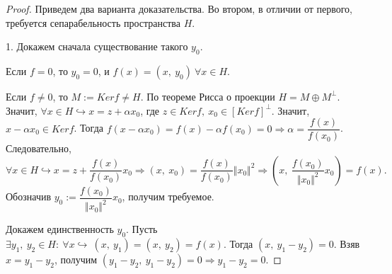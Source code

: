 \begin{proof}
Приведем два варианта доказательства. Во втором, в отличии от первого, требуется сепарабельность пространства $\displaystyle H$.

1. Докажем сначала существование такого $\displaystyle y_{0}$.

Если $\displaystyle f=0$, то $\displaystyle y_{0} =0$, и $\displaystyle f( x) =( x,\ y_{0}) \ \forall x\in H$.

Если $\displaystyle f\neq 0$, то $\displaystyle M:=Kerf\neq H$. По теореме Рисса о проекции $\displaystyle H=M\oplus M^{\perp }$. Значит, $\displaystyle \forall x\in H\hookrightarrow x=z+\alpha x_{0}$, где $\displaystyle z\in Kerf,\ x_{0} \in [ Kerf]^{\perp }$. Значит, $\displaystyle x-\alpha x_{0} \in Kerf$. Тогда $\displaystyle f( x-\alpha x_{0}) =f( x) -\alpha f( x_{0}) =0\Rightarrow \alpha =\dfrac{f( x)}{f( x_{0})}$. Следовательно,
\begin{equation*}
\forall x\in H\hookrightarrow x=z+\dfrac{f( x)}{f( x_{0})} x_{0} \Rightarrow ( x,\ x_{0}) =\dfrac{f( x)}{f( x_{0})}\Vert x_{0}\Vert ^{2} \Rightarrow \left( x,\ \dfrac{f( x_{0})}{\Vert x_{0}\Vert ^{2}} x_{0}\right) =f( x) .
\end{equation*}
Обозначив $\displaystyle y_{0} :=\dfrac{f( x_{0})}{\Vert x_{0}\Vert ^{2}} x_{0}$, получим требуемое.

Докажем единственность $\displaystyle y_{0}$. Пусть $\displaystyle \exists y_1 ,\ y_2 \in H:\ \forall x\hookrightarrow \ ( x,\ y_1) =\left( x,\ y_2\right) =f( x)$. Тогда $\displaystyle \left( x,\ y_1-y_2\right) =0$. Взяв $\displaystyle x=y_1-y_2$, получим $\displaystyle \left( y_1-y_2 ,\ y_1-y_2\right) =0\Rightarrow y_1-y_2 =0$.


\end{proof}
